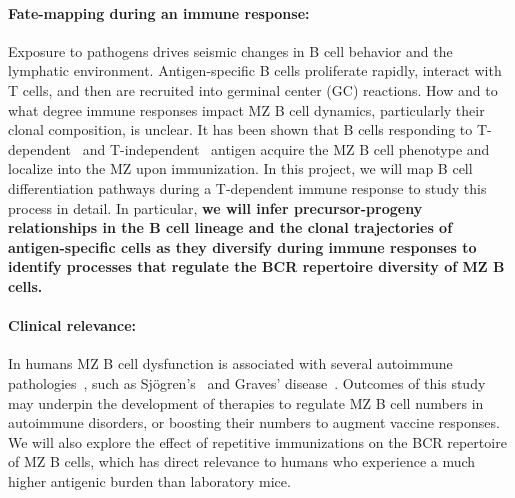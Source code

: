 \documentclass[11pt]{article}
\newcommand{\para}[1]{\vspace*{-4.5mm}\paragraph{#1}}
\newcommand{\red}[1]{{\color{red}{#1}}}
\begin{document}
\para{Fate-mapping during an immune response:} 
Exposure to pathogens drives seismic changes in B cell behavior and the lymphatic environment. Antigen-specific B cells proliferate rapidly, interact with T cells, and then are recruited into germinal center (GC) reactions. 
How and to what degree immune responses impact MZ B cell dynamics, particularly their clonal composition, is unclear.
It has been shown that B cells responding to T-dependent~\cite{Liu_1988, Yang_Shih_2002} and T-independent~\cite{Vinuesa_2003} antigen acquire the MZ B cell phenotype and localize into the MZ upon immunization.
In this project, we will map B cell differentiation pathways during a T-dependent immune response to study this process in detail. %
In particular, \textbf{we will infer precursor-progeny relationships in the B cell lineage and the clonal trajectories of antigen-specific cells as they diversify during immune responses to identify processes that regulate the BCR repertoire diversity of MZ B cells.}
 

\para{Clinical relevance:}
In humans MZ B cell dysfunction is associated with several autoimmune pathologies~\cite{Palm_2021, Appelgren_2018}, such as Sjögren's~\cite{Daridon_2006, Guerrier_2012} and  Graves' disease~\cite{Segundo_2001}.   
Outcomes of this study may underpin the development of therapies to regulate MZ B cell numbers in autoimmune disorders, or boosting their numbers to augment vaccine responses. %
We will also explore the effect of repetitive immunizations on the BCR repertoire of MZ B cells, which has direct relevance to humans who experience a much higher antigenic burden than laboratory mice.
\end{document}
